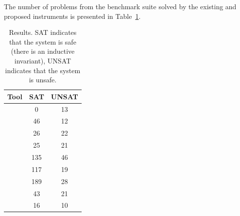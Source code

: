 The number of problems from the benchmark suite solved by the existing and proposed instruments is presented in Table~\ref{table:eval-all}.
\begin{table}[t]
    \caption{Results. SAT indicates that the system is safe (there is an inductive invariant), UNSAT indicates that the system is unsafe.}
    \label{table:eval-all}
    \small
    \centering
    \begin{tabular}{ |l|c|c| }
    \hline
    Tool & SAT & UNSAT\\\hline
    \cvcind{} & 0 & 13\\
    \eldarica{} & 46 & 12\\
    \racer{} & 26 & 22\\
    \ringen{\cvc{}} & 25 & 21\\
    \ringen{\vampire{}} & 135 & 46\\
    \ringenCICI{\cvc{}} & 117 & 19\\
    \ringenCICI{\vampire{}} & 189 & 28\\
    \ringenSync{} & 43 & 21\\
    \vericat{} & 16 & 10\\
    \hline
    \end{tabular}
\end{table}


